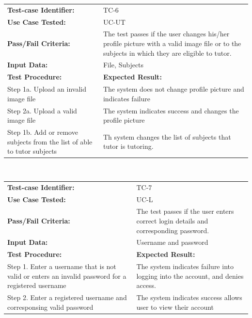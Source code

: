 \documentclass[12pt]{article}
\begin{document}
\begin{tabular}{| p{8cm} | p{8cm} |} \hline
	\textbf{Test-case Identifier:}& TC-6\\
	\textbf{Use Case Tested:}& UC-UT\\
	\textbf{Pass/Fail Criteria:}& The test passes if the user changes his/her profile picture with a valid image file or to the subjects in which they are eligible to tutor.\\
	\textbf{Input Data:}& File, Subjects\\\hline
	\textbf{Test Procedure:}& \textbf{Expected Result:} \\\hline
	Step 1a. Upload an invalid image file & The system does not change profile picture and indicates failure\\
	Step 2a. Upload a valid image file & The system indicates success and changes the profile picture\\
		Step 1b. Add or remove subjects from the list of able to tutor subjects & Th system changes the list of subjects that tutor is tutoring.  \\\hline
\end{tabular}
\\

\begin{tabular}{| p{8cm} | p{8cm} |} \hline
	\textbf{Test-case Identifier:}& TC-7\\
	\textbf{Use Case Tested:}& UC-L\\
	\textbf{Pass/Fail Criteria:}& The test passes if the user enters correct login details and corresponding password.\\
	\textbf{Input Data:}& Username and password\\\hline
	\textbf{Test Procedure:}& \textbf{Expected Result:} \\\hline
	Step 1. Enter a username that is not valid or enters an invalid password for a registered username & The system indicates failure into logging into the account, and denies access. \\
	Step 2. Enter a registered username and corresponsing valid password  & The system indicates success allows user to view their account\\
		\hline
\end{tabular}
\\
\end{document}
